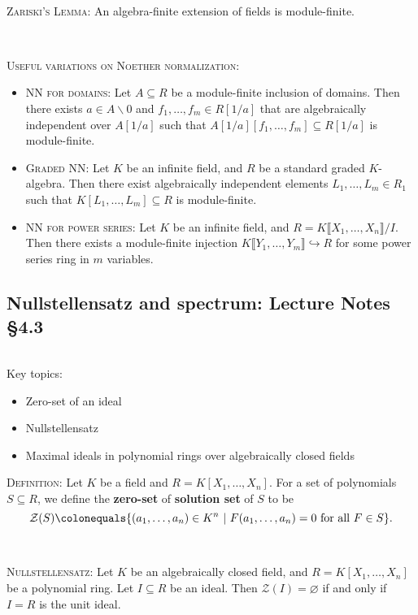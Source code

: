 \documentclass[12pt]{amsart}
\newcommand{\cZ}{\mathcal{Z}}
\newcommand{\0}{$\phantom{.}$}
\newcommand{\1}{\mathbbm{1}}
\newcommand\ceq{\colonequals}
\begin{document}
\


\noindent \textsc{Zariski's Lemma:} An algebra-finite extension of fields is module-finite.

\

\noindent \textsc{Useful variations on Noether normalization:}
\begin{itemize}
\item \textsc{NN for domains:} Let $A\subseteq R$ be a module-finite inclusion of domains\footnotemark. Then there exists $a\in A\smallsetminus 0$ and $f_1,\dots,f_m\in R[1/a]$ that are algebraically independent over $A[1/a]$ such that $A[1/a][f_1,\dots,f_m] \subseteq R[1/a]$ is module-finite.
\item \textsc{Graded NN:} Let $K$ be an infinite field, and $R$ be a standard graded $K$-algebra. Then there exist algebraically independent elements $L_1,\dots,L_m \in R_1$ such that $K[L_1,\dots,L_m] \subseteq R$ is module-finite.
\item \textsc{NN for power series:} Let $K$ be an infinite field, and $R=K\llbracket X_1,\dots,X_n \rrbracket / I$. Then there exists a module-finite injection $K\llbracket Y_1,\dots,Y_m \rrbracket \hookrightarrow R$ for some power series ring in $m$ variables.
\end{itemize}



\newpage
\subsection{Nullstellensatz and spectrum: Lecture Notes \S4.3} \0

\begin{framed} Key topics:
\begin{itemize}
\item Zero-set of an ideal
\item Nullstellensatz
\item Maximal ideals in polynomial rings over algebraically closed fields
\end{itemize}
\end{framed}

\noindent \textsc{Definition:} Let $K$ be a field and $R=K[X_1,\dots,X_n]$. For a set of polynomials $S\subseteq R$, we define the \textbf{zero-set} of \textbf{solution set} of $S$ to be
\[ \cZ(S) \ceq \{ (a_1,\dots,a_n)\in K^n \ | \ F(a_1,\dots,a_n)=0 \ \text{for all} \ F\in S\}.\]

\

\noindent \textsc{Nullstellensatz:} Let $K$ be an algebraically closed field, and $R=K[X_1,\dots,X_n]$ be a polynomial ring. Let $I\subseteq R$ be an ideal. Then $\cZ(I)=\varnothing$ if and only if $I=R$ is the unit ideal. 
\end{document}
